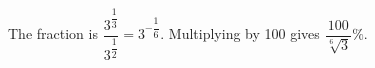 The fraction is $\dfrac{3^{\dfrac{1}{3}}}{3^{\dfrac{1}{2}}}=3^{-\dfrac{1}{6}}$. Multiplying by 100 gives $\boxed{\dfrac{100}{\sqrt[6]3}\%}$.

